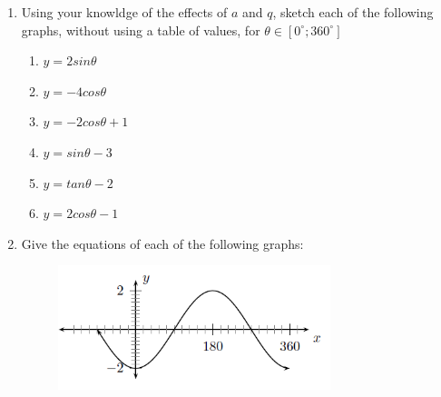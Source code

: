           \label{m39414*id91858}\begin{enumerate}[noitemsep, label=\textbf{\arabic*}. ] 
            \label{m39414*uid90}\item Using your knowldge of the effects of \begin{math}a\end{math} and \begin{math}q\end{math}, sketch each of the following graphs, without using a table of values, for \begin{math}\theta \in \left[{0}^{\circ };{360}^{\circ }\right]\end{math}\label{m39414*id91924}\begin{enumerate}[noitemsep, label=\textbf{\alph*}. ] 
            \label{m39414*uid91}\item \begin{math}y=2sin\theta \end{math}\label{m39414*uid92}\item \begin{math}y=-4cos\theta \end{math}\label{m39414*uid93}\item \begin{math}y=-2cos\theta +1\end{math}\label{m39414*uid94}\item \begin{math}y=sin\theta -3\end{math}\label{m39414*uid95}\item \begin{math}y=tan\theta -2\end{math}\label{m39414*uid96}\item \begin{math}y=2cos\theta -1\end{math}\end{enumerate}
                \label{m39414*uid97}\item Give the equations of each of the following graphs:


    \setcounter{subfigure}{0}


	\begin{figure}[H] %
    \begin{center}
    \label{m39414*id92152!!!underscore!!!media}\label{m39414*id92152!!!underscore!!!printimage}\includegraphics[width=300px]{col11306.imgs/m39414_trigrep4.png} %
        

\end{center}
\end{figure}
\end{enumerate}
